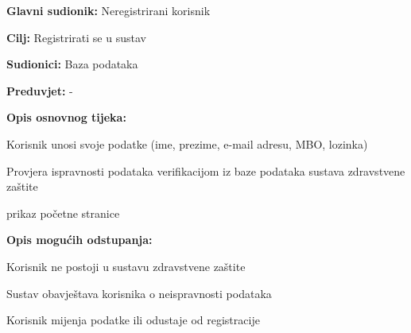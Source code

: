 				\noindent {}
				\begin{packed_item}
					
					\item \textbf{Glavni sudionik: }Neregistrirani korisnik
					\item  \textbf{Cilj: }Registrirati se u sustav
					\item  \textbf{Sudionici: }Baza podataka
					\item  \textbf{Preduvjet: } -  
					\item  \textbf{Opis osnovnog tijeka: }
					
					\item[] \begin{packed_enum}
						
						\item Korisnik unosi svoje podatke (ime, prezime, e-mail adresu, MBO, lozinka)
						\item Provjera ispravnosti podataka verifikacijom iz baze podataka sustava zdravstvene zaštite
						\item prikaz početne stranice
					\end{packed_enum}
					
					\item  \textbf{Opis mogućih odstupanja:}
					
					\item[] \begin{packed_item}
						
						\item[2.a] Korisnik ne postoji u sustavu zdravstvene zaštite
						\item[] \begin{packed_enum}
							
							\item Sustav obavještava korisnika o neispravnosti podataka
							\item Korisnik mijenja podatke ili odustaje od registracije
							
						\end{packed_enum}
						
					\end{packed_item}
				\end{packed_item}
				
